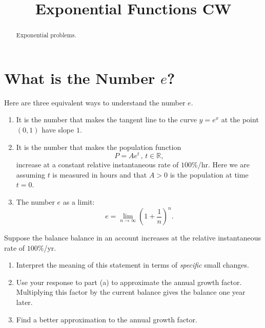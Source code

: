 \documentclass{ximera}
\title{Exponential Functions CW}
\begin{document}
\begin{abstract}
Exponential problems.
\end{abstract}
\maketitle


\section{What is the Number $e$?}
Here are three equivalent ways to understand the number $e$.

\begin{enumerate}
\item It is the number that makes the tangent line to the curve $y=e^x$ at the point $(0,1)$ have slope $1$.

\item It is the number that makes the population function
\[
   P = A e^t \, , \, t \in \mathbb{R},
\] 
increase at a constant relative instantaneous rate of $100\%$/hr. Here we are assuming $t$ is measured in hours and that $A>0$ is the population at time $t=0$.

\item The number $e$ as a limit:
\[
  e = \lim_{n\to \infty} \left( 1 + \frac{1}{n} \right)^n.
\]
\end{enumerate}


\begin{question}  \label{Q39fvc3m3}

Suppose the balance balance in an account increases at the relative instantaneous rate of $100\%$/yr. 

\begin{enumerate}

\item Interpret the meaning of this statement in terms of \emph{specific} small changes.

\item Use your response to part (a) to approximate the annual growth factor. Multiplying this factor by the current balance gives the balance one year later.

\item Find a better approximation to the annual growth factor.


\end{enumerate}
\end{question}
\end{document}
